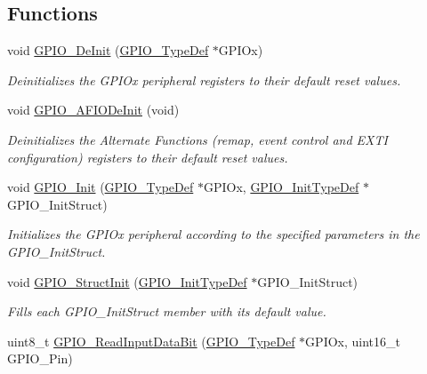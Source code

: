 \subsection*{Functions}
\begin{DoxyCompactItemize}
\item 
void \hyperlink{group___g_p_i_o___private___functions_gaa60bdf3182c44b5fa818f237042f52ee}{G\+P\+I\+O\+\_\+\+De\+Init} (\hyperlink{struct_g_p_i_o___type_def}{G\+P\+I\+O\+\_\+\+Type\+Def} $\ast$G\+P\+I\+Ox)
\begin{DoxyCompactList}\small\item\em Deinitializes the G\+P\+I\+Ox peripheral registers to their default reset values. \end{DoxyCompactList}\item 
void \hyperlink{group___g_p_i_o___private___functions_ga7f645e6b6146818c3d6c19021e70170c}{G\+P\+I\+O\+\_\+\+A\+F\+I\+O\+De\+Init} (void)
\begin{DoxyCompactList}\small\item\em Deinitializes the Alternate Functions (remap, event control and E\+X\+TI configuration) registers to their default reset values. \end{DoxyCompactList}\item 
void \hyperlink{group___g_p_i_o___private___functions_ga71abf9404261370d03cca449b88d3a65}{G\+P\+I\+O\+\_\+\+Init} (\hyperlink{struct_g_p_i_o___type_def}{G\+P\+I\+O\+\_\+\+Type\+Def} $\ast$G\+P\+I\+Ox, \hyperlink{struct_g_p_i_o___init_type_def}{G\+P\+I\+O\+\_\+\+Init\+Type\+Def} $\ast$G\+P\+I\+O\+\_\+\+Init\+Struct)
\begin{DoxyCompactList}\small\item\em Initializes the G\+P\+I\+Ox peripheral according to the specified parameters in the G\+P\+I\+O\+\_\+\+Init\+Struct. \end{DoxyCompactList}\item 
void \hyperlink{group___g_p_i_o___private___functions_gab28de41278e7f8c63d0851e2733b10df}{G\+P\+I\+O\+\_\+\+Struct\+Init} (\hyperlink{struct_g_p_i_o___init_type_def}{G\+P\+I\+O\+\_\+\+Init\+Type\+Def} $\ast$G\+P\+I\+O\+\_\+\+Init\+Struct)
\begin{DoxyCompactList}\small\item\em Fills each G\+P\+I\+O\+\_\+\+Init\+Struct member with its default value. \end{DoxyCompactList}\item 
uint8\+\_\+t \hyperlink{group___g_p_i_o___private___functions_ga98772ef6b639b3fa06c8ae5ba28d3aaa}{G\+P\+I\+O\+\_\+\+Read\+Input\+Data\+Bit} (\hyperlink{struct_g_p_i_o___type_def}{G\+P\+I\+O\+\_\+\+Type\+Def} $\ast$G\+P\+I\+Ox, uint16\+\_\+t G\+P\+I\+O\+\_\+\+Pin)

\end{DoxyCompactItemize}
